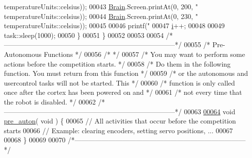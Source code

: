 \begin{DoxyCode}
{{{{{{      temperatureUnits::celsius));
00043     \mbox{\hyperlink{main_8cpp_a4918ae1421e0a76946a52104b80cd8b8_a4918ae1421e0a76946a52104b80cd8b8}{Brain}}.Screen.printAt(0, 200, \textcolor{stringliteral}{"%
      temperatureUnits::celsius));
00044     \mbox{\hyperlink{main_8cpp_a4918ae1421e0a76946a52104b80cd8b8_a4918ae1421e0a76946a52104b80cd8b8}{Brain}}.Screen.printAt(0, 230, \textcolor{stringliteral}{"%
      temperatureUnits::celsius));
00045 
00046   printf(\textcolor{stringliteral}{"%
00047   \mbox{\hyperlink{main_8cpp_acb559820d9ca11295b4500f179ef6392_acb559820d9ca11295b4500f179ef6392}{i}}++;
00048     
00049     task::sleep(1000);
00050   \}
00051 \}
00052 
00053 
00054 \textcolor{comment}{/*---------------------------------------------------------------------------*/}
00055 \textcolor{comment}{/*                          Pre-Autonomous Functions                         */}
00056 \textcolor{comment}{/*                                                                           */}
00057 \textcolor{comment}{/*  You may want to perform some actions before the competition starts.      */}
00058 \textcolor{comment}{/*  Do them in the following function.  You must return from this function   */}
00059 \textcolor{comment}{/*  or the autonomous and usercontrol tasks will not be started.  This       */}
00060 \textcolor{comment}{/*  function is only called once after the cortex has been powered on and    */} 
00061 \textcolor{comment}{/*  not every time that the robot is disabled.                               */}
00062 \textcolor{comment}{/*---------------------------------------------------------------------------*/}
00063 
\mbox{\hyperlink{main_8cpp_ac6b858ea8606cdfaee934aac6be66a96_ac6b858ea8606cdfaee934aac6be66a96}{00064}} \textcolor{keywordtype}{void} \mbox{\hyperlink{main_8cpp_ac6b858ea8606cdfaee934aac6be66a96_ac6b858ea8606cdfaee934aac6be66a96}{pre\_auton}}( \textcolor{keywordtype}{void} ) \{
00065   \textcolor{comment}{// All activities that occur before the competition starts}
00066   \textcolor{comment}{// Example: clearing encoders, setting servo positions, ...}
00067   
00068 \}
00069 
00070 \textcolor{comment}{/*---------------------------------------------------------------------------*/}
}}}}}}}}}
\end{DoxyCode}
